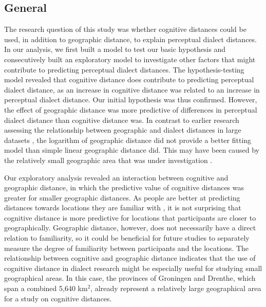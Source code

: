 \documentclass[output=paper,colorlinks,citecolor=brown,draft]{langscibook}
\begin{document}
\subsection{General}
The research question of this study was whether cognitive distances could be used, in addition to geographic distance, to explain perceptual dialect distances. In our analysis, we first built a model to test our basic hypothesis and consecutively built an exploratory model to investigate other factors that might contribute to predicting perceptual dialect distances. The hypothesis-testing model revealed that cognitive distance does contribute to predicting perceptual dialect distance, as an increase in cognitive distance was related to an increase in perceptual dialect distance. Our initial hypothesis was thus confirmed. However, the effect of geographic distance was more predictive of differences in perceptual dialect distance than cognitive distance was. In contrast to earlier research assessing the relationship between geographic and dialect distances in large datasets \citep{heeringa_validating_2002}, the logarithm of geographic distance did not provide a better fitting model than simple linear geographic distance did.  This may have been caused by the relatively small geographic area that was under investigation \citep{heeringa_geographic_2007}.

Our exploratory analysis revealed an interaction between cognitive and geographic distance, in which the predictive value of cognitive distances was greater for smaller geographic distances. As people are better at predicting distances towards locations they are familiar with \citep{day_urban_1976, montello_measurement_1991}, it is not surprising that cognitive distance is more predictive for locations that participants are closer to geographically. Geographic distance, however, does not necessarily have a direct relation to familiarity, so it could be beneficial for future studies to separately measure the degree of familiarity between participants and the locations. The relationship between cognitive and geographic distance indicates that the use of cognitive distance in dialect research might be especially useful for studying small geographical areas. In this case, the provinces of Groningen and Drenthe, which span a combined 5,640 km$^2$, already represent a relatively large geographical area for a study on cognitive distances.
 
\end{document}
